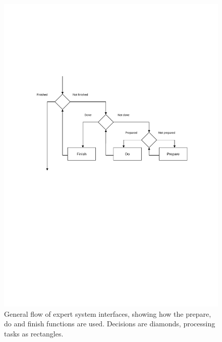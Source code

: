 \documentclass[a4paper, 11pt]{article}
\begin{document}
\begin{figure}
\caption{General flow of expert system interfaces, showing how the
  prepare, do and finish functions are used. Decisions are diamonds,
  processing tasks as rectangles.
\label{figure:fig6}}
\centering
\includegraphics[scale=0.5]{figures/Fig6.pdf}
\end{figure}




{}
%

\end{document}
